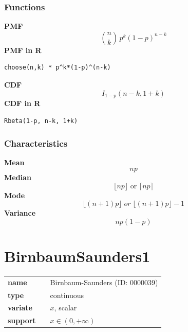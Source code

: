 \subsubsection*{Functions}

\smallskip \noindent \hspace{.2cm} \textbf{PMF} 
\begin{equation*}{n \choose k}\, p^k (1-p)^{n-k}\end{equation*}
\smallskip \noindent \hspace{.2cm} \textbf{PMF in R}  
\begin{verbatim}choose(n,k) * p^k*(1-p)^(n-k)\end{verbatim}
\smallskip \noindent \hspace{.2cm} \textbf{CDF} 
\begin{equation*}I_{1-p}(n - k, 1 + k)\end{equation*}
\smallskip \noindent \hspace{.2cm} \textbf{CDF in R} 
\begin{verbatim}Rbeta(1-p, n-k, 1+k)\end{verbatim}
\smallskip
\subsubsection*{Characteristics}
\smallskip \noindent \hspace{.2cm} \textbf{Mean} 
\begin{equation*}np\end{equation*}
\smallskip \noindent \hspace{.2cm} \textbf{Median} 
\begin{equation*}\lfloor np \rfloor \text{ or } \lceil np \rceil\end{equation*}
\smallskip \noindent \hspace{.2cm} \textbf{Mode} 
\begin{equation*}\lfloor (n + 1)p \rfloor \; or \; \lfloor (n + 1)p \rfloor - 1\end{equation*}
\smallskip \noindent \hspace{.2cm} \textbf{Variance} 
\begin{equation*}np(1 - p)\end{equation*}
\smallskip
\section*{BirnbaumSaunders1} 

  \bigskip 

\begin{tabular}{p{2cm}cl}
\textbf{name} & & Birnbaum-Saunders (ID: 0000039)\\ 
 
\textbf{type} & & continuous \\ 

\textbf{variate} & & $x$, scalar \\ 

\textbf{support} & & $x \in (0,+\infty)$
\end{tabular}

